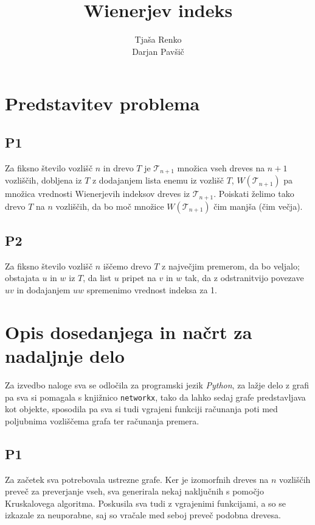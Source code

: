 \documentclass[a4paper, 12 pt]{article}
\title{Wienerjev indeks}
\author{Tjaša Renko \\ Darjan Pavšič}
\begin{document}
\maketitle

\section{Predstavitev problema}

\subsection{P1}

Za fiksno število vozlišč $n$ in drevo $T$ je $\mathscr{T}_{n+1}$ množica vseh dreves na $n+1$ vozliščih, dobljena iz $T$ z dodajanjem lista enemu iz vozlišč $T$, $W(\mathscr{T}_{n+1})$ pa množica vrednosti Wienerjevih indeksov dreves iz $\mathscr{T}_{n+1}$. Poiskati želimo tako drevo $T$ na $n$ vozliščih, da bo moč množice $W(\mathscr{T}_{n+1})$ čim manjša (čim večja).

\subsection{P2}

Za fiksno število vozlišč $n$ iščemo drevo $T$ z največjim premerom, da bo veljalo; obstajata $u$ in $w$ iz $T$, da list $u$ pripet na $v$ in $w$ tak, da z odstranitvijo povezave $uv$ in dodajanjem $uw$ spremenimo vrednost indeksa za 1.

\section{Opis dosedanjega in načrt za nadaljnje delo}

Za izvedbo naloge sva se odločila za programski jezik \textit{Python}, za lažje delo z grafi pa sva si pomagala s knjižnico \texttt{networkx}, tako da lahko sedaj grafe predstavljava kot objekte, sposodila pa sva si tudi vgrajeni funkciji računanja poti med poljubnima vozliščema grafa ter računanja premera.

\subsection{P1}

Za začetek sva potrebovala ustrezne grafe. Ker je izomorfnih dreves na $n$ vozliščih preveč za preverjanje vseh, sva generirala nekaj naključnih s pomočjo Kruskalovega algoritma. Poskusila sva tudi z vgrajenimi funkcijami, a so se izkazale za neuporabne, saj so vračale med seboj preveč podobna drevesa. \newline
\end{document}
